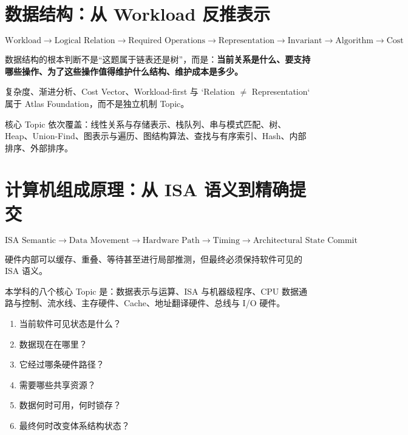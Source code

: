 \documentclass[11pt,a4paper]{ctexart}
\newcommand{\kw}[1]{\textbf{#1}}
\begin{document}
\section{数据结构：从 Workload 反推表示}

\begin{corebox}
\[
\boxed{
\text{Workload}
\to \text{Logical Relation}
\to \text{Required Operations}
\to \text{Representation}
\to \text{Invariant}
\to \text{Algorithm}
\to \text{Cost}
}
\]
\end{corebox}

数据结构的根本判断不是“这题属于链表还是树”，而是：\kw{当前关系是什么、要支持哪些操作、为了这些操作值得维护什么结构、维护成本是多少。}

复杂度、渐进分析、Cost Vector、Workload-first 与 `Relation $\neq$ Representation` 属于 Atlas Foundation，而不是独立机制 Topic。

核心 Topic 依次覆盖：线性关系与存储表示、栈队列、串与模式匹配、树、Heap、Union-Find、图表示与遍历、图结构算法、查找与有序索引、Hash、内部排序、外部排序。

\section{计算机组成原理：从 ISA 语义到精确提交}

\begin{corebox}
\[
\boxed{
\text{ISA Semantic}
\to \text{Data Movement}
\to \text{Hardware Path}
\to \text{Timing}
\to \text{Architectural State Commit}
}
\]
\end{corebox}

硬件内部可以缓存、重叠、等待甚至进行局部推测，但最终必须保持软件可见的 ISA 语义。

本学科的八个核心 Topic 是：数据表示与运算、ISA 与机器级程序、CPU 数据通路与控制、流水线、主存硬件、Cache、地址翻译硬件、总线与 I/O 硬件。

\begin{method}[计组起手六问]
\begin{enumerate}
\item 当前软件可见状态是什么？
\item 数据现在在哪里？
\item 它经过哪条硬件路径？
\item 需要哪些共享资源？
\item 数据何时可用，何时锁存？
\item 最终何时改变体系结构状态？
\end{enumerate}
\end{method}
\end{document}
